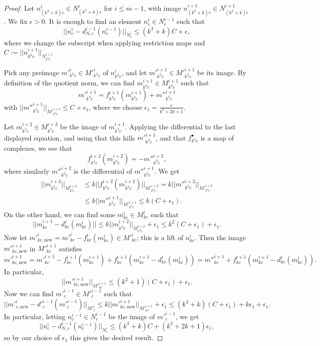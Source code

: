 \begin{proof}
\leanok
Let $n^i_{(k^3+k)c}\in N^i_{(k^3+k)c}$ for $i\leq m-1$, with image $n^{i+1}_{(k^3+k)c}\in N^{i+1}_{(k^3+k)c}$. We fix $\epsilon > 0$. It is enough to find an element $n^i_c\in N^{i-1}_c$ such that
\[
||n^i_c - d^{i-1}_{N,c}(n^{i-1}_c)||_{N^i_c}\leq (k^3+k)C + \epsilon,
\]
where we change the subscript when applying restriction maps and $C:=||n^{i+1}_{k^3c}||_{N^{i+1}_{k^3c}}$

Pick any preimage $m'^i_{k^3c}\in M'^i_{k^3c}$ of $n^i_{k^3c}$, and let $m'^{i+1}_{k^3c}\in M'^{i+1}_{k^3c}$ be its image. By definition of the quotient norm, we can find $m^{i+1}_{k^3c}\in M^{i+1}_{k^3c}$ such that
\[
m'^{i+1}_{k^3c} = f^{i+1}_{k^3c}(m^{i+1}_{k^3c}) + m''^{i+1}_{k^3c}
\]
with $||m''^{i+1}_{k^3c}||_{M'^{i+1}_{k^3c}}\leq C + \epsilon_1$, where we choose $\epsilon_1 = \frac{\epsilon}{k ^ 3 + 2k + 1}$.

Let $m^{i+2}_{k^3c}\in M^{i+2}_{k^3c}$ be the image of $m^{i+1}_{k^3c}$. Applying the differential to the last displayed equation, and using that this kills $m'^{i+1}_{k^3c}$, and that $f^\bullet_{k^3c}$ is a map of complexes, we see that
\[
f^{i+2}_{k^3c}(m^{i+2}_{k^3c}) = -m''^{i+2}_{k^3c},
\]
where similarly $m''^{i+2}_{k^3c}$ is the differential of $m''^{i+1}_{k^3c}$. We get
\[\begin{aligned}
||m^{i+2}_{k^2c}||_{M^{i+2}_{k^2c}}&\leq k||f^{i+2}_{k^3c}(m^{i+2}_{k^3c})||_{M'^{i+2}_{k^3c}} = k||m''^{i+2}_{k^3c}||_{M'^{i+2}_{k^3c}}\\
&\leq k||m''^{i+1}_{k^3c}||_{M'^{i+1}_{k^3c}}\leq k(C+\epsilon_1).
\end{aligned}\]
On the other hand, we can find some $m^i_{kc}\in M^i_{kc}$ such that
\[
||m^{i+1}_{kc}-d^i_{kc}(m^i_{kc})||\leq k||m^{i+2}_{k^2c}||_{M^{i+2}_{k^2c}} + \epsilon_1 \leq k^2(C+\epsilon_1) + \epsilon_1.
\]
Now let $m'^i_{kc,\mathrm{new}} = m'^i_{kc}-f^i_{kc}(m^i_{kc})\in M'^i_{kc}$; this is a lift of $n^i_{kc}$. Then the image $m'^{i+1}_{kc,\mathrm{new}}$ in $M'^{i+1}_{kc}$ satisfies
\[
m'^{i+1}_{kc,\mathrm{new}} = m'^{i+1}_{kc}-f^{i+1}_{kc}(m^{i+1}_{kc}) + f^{i+1}_{kc}(m^{i+1}_{kc}-d^i_{kc}(m^i_{kc})) = m''^{i+1}_{kc} + f^{i+1}_{kc}(m^{i+1}_{kc}-d^i_{kc}(m^i_{kc})).
\]
In particular,
\[
||m'^{i+1}_{kc,\mathrm{new}}||_{M'^{i+1}_{kc}}\leq (k^2 + 1)(C+\epsilon_1) + \epsilon_1.
\]
Now we can find $m'^{i-1}_c\in M'^{i-1}_c$ such that
\[
||m'^i_{c,\mathrm{new}} - d'^{i-1}_c(m'^{i-1}_c)||_{M'^i_c}\leq k||m'^{i+1}_{kc,\mathrm{new}}||_{M'^{i+1}_{kc}} + \epsilon_1 \leq (k^3+k)(C+\epsilon_1) + k\epsilon_1 + \epsilon_1.
\]
In particular, letting $n^{i-1}_c\in N^{i-1}_c$ be the image of $m'^{i-1}_c$, we get
\[
||n^i_c - d^{i-1}_{N,c}(n^{i-1}_c)||_{N^i_c}\leq (k^3+k)C+(k^3+2k+1)\epsilon_1,
\]
so by our choice of $\epsilon_1$ this gives the desired result.
\end{proof}


